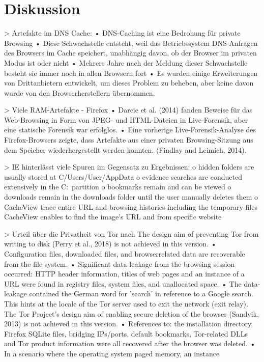 \chapter{Diskussion}

> Artefakte im DNS Cache: \cite{Satvat.2014}
	•	DNS-Caching ist eine Bedrohung für private Browsing
	•	Diese Schwachstelle entsteht, weil das Betriebssystem DNS-Anfragen des Browsers im Cache speichert, unabhängig davon, ob der Browser im privaten Modus ist oder nicht
	•	Mehrere Jahre nach der Meldung dieser Schwachstelle besteht sie immer noch in allen Browsern fort
	•	Es wurden einige Erweiterungen von Drittanbietern entwickelt, um dieses Problem zu beheben, aber keine davon wurde von den Browserherstellern übernommen.
	

> Viele RAM-Artefakte
	- Firefox \cite{Muir.2019}
		•	Darcie et al. (2014) fanden Beweise für das Web-Browsing in Form von JPEG- und HTML-Dateien in Live-Forensik, aber eine statische Forensik war erfolglos.
		•	Eine vorherige Live-Forensik-Analyse des Firefox-Browsers zeigte, dass Artefakte aus einer privaten Browsing-Sitzung aus dem Speicher wiederhergestellt werden konnten. (Findlay and Leimich, 2014). 
		

> IE hinterlässt viele Spuren im Gegensatz zu Ergebnissen: \cite{Md.2018}
	o	hidden folders are usually stored at C/Users/User/AppData
	o	evidence searches are conducted extensively in the C:\ partition
	o	bookmarks remain and can be viewed
	o	downloads remain in the downloads folder until the user manually deletes them
	o	CacheView trace entire URL and browsing histories including the temporary files
	CacheView enables to find the image’s URL and from specific website
	
> Urteil über die Privatheit von Tor nach \cite{Muir.2019}
	The design aim of preventing Tor from writing to disk (Perry et al., 2018) is not achieved in this version.
		•	Configuration files, downloaded files, and browserrelated data are recoverable from the file system.
		•	Significant data-leakage from the browsing session occurred: HTTP header information, titles of web pages and an instance of a URL were found in registry files, system files, and unallocated space.
		•	The data-leakage contained the German word for ’search’ in reference to a Google search. This hints at the locale of the Tor server used to exit the network (exit relay).
	The Tor Project’s design aim of enabling secure deletion of the browser (Sandvik, 2013) is not achieved in this version.
		•	References to: the installation directory, Firefox SQLite files, bridging IPs/ports, default bookmarks, Tor-related DLLs and Tor product information were all recovered after the browser was deleted.
		•	In a scenario where the operating system paged memory, an instance

